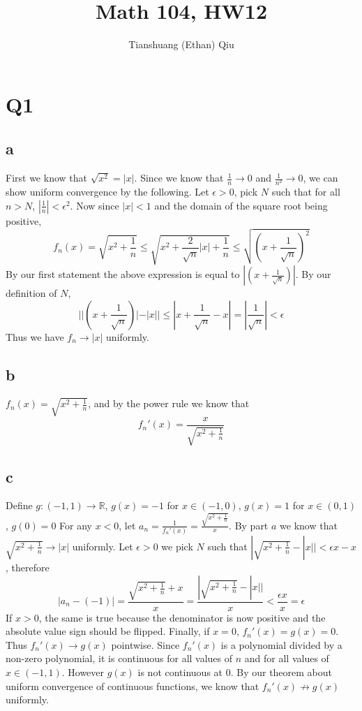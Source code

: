 \documentclass[12pt]{article}
\author{Tianshuang (Ethan) Qiu}
\newcommand{\R}{\mathbb{R}}
\begin{document}
\title{Math 104, HW12}
\maketitle
\newpage

\section{Q1}
\subsection{a}
First we know that $\sqrt{x^2} = |x|$. Since we know that $\frac{1}{n} \to 0$ and $\frac{1}{n^2} \to 0$, we can show uniform convergence by the following.
\newline
Let $\epsilon > 0$, pick $N$ such that for all $n > N$, $|\frac{1}{n}| < \epsilon^2$. Now since $|x| < 1$ and the domain of the square root being positive,
$$f_n(x) = \sqrt{x^2 + \frac{1}{n}} \leq \sqrt{x^2 + \frac{2}{\sqrt{n}}|x| + \frac{1}{n}} \leq \sqrt{(x+\frac{1}{\sqrt{n}})^2}$$
By our first statement the above expression is equal to $|(x+\frac{1}{\sqrt{n}})|$. By our definition of $N$,
$$||(x+\frac{1}{\sqrt{n}})| - |x|| \leq |x+\frac{1}{\sqrt{n}}-x| = |\frac{1}{\sqrt{n}}| < \epsilon$$
Thus we have $f_n \to |x|$ uniformly.

\subsection{b}
$f_n(x) = \sqrt{x^2 + \frac{1}{n}}$, and by the power rule we know that
$$f_n'(x) = \frac{x}{\sqrt{x^2+\frac{1}{n}}}$$

\subsection{c}
Define $g: (-1,1) \to \R$, $g(x) = -1 $ for $x \in (-1,0)$, $g(x) = 1 $ for $x \in (0, 1)$, $g(0)=0$
\newline
For any $x < 0$, let $a_n = \frac{1}{f_n'(x)} = \frac{\sqrt{x^2+\frac{1}{n}}}{x}$. By part $a$ we know that $\sqrt{x^2+\frac{1}{n}} \to |x|$ uniformly.
Let $\epsilon>0$ we pick $N$ such that $|\sqrt{x^2+\frac{1}{n}}-|x||<\epsilon x - x$, therefore
$$|a_n-(-1)| = \frac{\sqrt{x^2+\frac{1}{n}}+x}{x} = \frac{|\sqrt{x^2+\frac{1}{n}}-|x||}{x} < \frac{\epsilon x}{x} = \epsilon$$
If $x>0$, the same is true because the denominator is now positive and the absolute value sign should be flipped. Finally, if $x=0$, $f_n'(x)=g(x)=0$. Thus $f_n'(x) \to g(x)$ pointwise.
\newline
Since $f_n'(x)$ is a polynomial divided by a non-zero polynomial, it is continuous for all values of $n$ and for all values of $x \in (-1,1)$. However $g(x)$ is not continuous at $0$. By our theorem about uniform convergence of continuous functions, we know that $f_n'(x) \not \to g(x)$ uniformly.
\newpage
\end{document}
